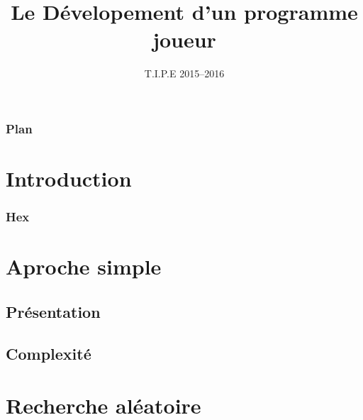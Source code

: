 \documentclass{beamer}
\title[Hex]{Le Dévelopement d'un programme joueur}
\date{T.I.P.E 2015--2016}
\begin{document}
\begin{frame}
  \titlepage
\end{frame}

\begin{frame}
  \frametitle{Plan}
  \tableofcontents
\end{frame}

\section{Introduction}

\begin{frame}
  \frametitle{Hex}
  \begin{HexBoard}[board size=10]
  \end{HexBoard}
\end{frame}

\section{Aproche simple}

\subsection{Présentation}


\subsection{Complexité}


\section{Recherche aléatoire}


\end{document}
